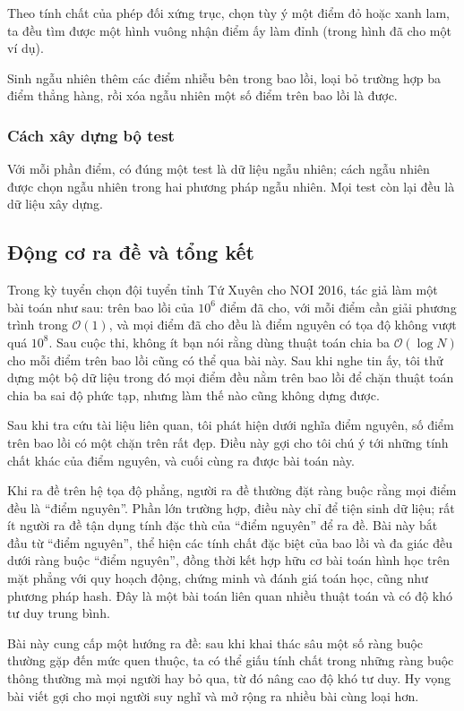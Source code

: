 \documentclass[11pt]{article}
\newcommand{\Oh}{\mathcal{O}}
\begin{document}
Theo tính chất của phép đối xứng trục, chọn tùy ý một điểm đỏ hoặc xanh lam,
ta đều tìm được một hình vuông nhận điểm ấy làm đỉnh (trong hình đã cho một ví
dụ).

Sinh ngẫu nhiên thêm các điểm nhiễu bên trong bao lồi, loại bỏ trường hợp ba
điểm thẳng hàng, rồi xóa ngẫu nhiên một số điểm trên bao lồi là được.

\subsubsection{Cách xây dựng bộ test}

Với mỗi phần điểm, có đúng một test là dữ liệu ngẫu nhiên; cách ngẫu nhiên
được chọn ngẫu nhiên trong hai phương pháp ngẫu nhiên. Mọi test còn lại đều là
dữ liệu xây dựng.

\subsection{Động cơ ra đề và tổng kết}

Trong kỳ tuyển chọn đội tuyển tỉnh Tứ Xuyên cho NOI 2016, tác giả làm một bài
toán như sau: trên bao lồi của \(10^6\) điểm đã cho, với mỗi điểm cần giải
phương trình trong \(\Oh(1)\), và mọi điểm đã cho đều là điểm nguyên có tọa độ
không vượt quá \(10^8\). Sau cuộc thi, không ít bạn nói rằng dùng thuật toán
chia ba \(\Oh(\log N)\) cho mỗi điểm trên bao lồi cũng có thể qua bài này. Sau
khi nghe tin ấy, tôi thử dựng một bộ dữ liệu trong đó mọi điểm đều nằm trên
bao lồi để chặn thuật toán chia ba sai độ phức tạp, nhưng làm thế nào cũng
không dựng được.

Sau khi tra cứu tài liệu liên quan, tôi phát hiện dưới nghĩa điểm nguyên, số
điểm trên bao lồi có một chặn trên rất đẹp. Điều này gợi cho tôi chú ý tới
những tính chất khác của điểm nguyên, và cuối cùng ra được bài toán này.

Khi ra đề trên hệ tọa độ phẳng, người ra đề thường đặt ràng buộc rằng mọi điểm
đều là ``điểm nguyên''. Phần lớn trường hợp, điều này chỉ để tiện sinh dữ
liệu; rất ít người ra đề tận dụng tính đặc thù của ``điểm nguyên'' để ra đề.
Bài này bắt đầu từ ``điểm nguyên'', thể hiện các tính chất đặc biệt của bao
lồi và đa giác đều dưới ràng buộc ``điểm nguyên'', đồng thời kết hợp hữu cơ
bài toán hình học trên mặt phẳng với quy hoạch động, chứng minh và đánh giá
toán học, cũng như phương pháp hash. Đây là một bài toán liên quan nhiều thuật
toán và có độ khó tư duy trung bình.

Bài này cung cấp một hướng ra đề: sau khi khai thác sâu một số ràng buộc
thường gặp đến mức quen thuộc, ta có thể giấu tính chất trong những ràng buộc
thông thường mà mọi người hay bỏ qua, từ đó nâng cao độ khó tư duy. Hy vọng
bài viết gợi cho mọi người suy nghĩ và mở rộng ra nhiều bài cùng loại hơn.
\end{document}
